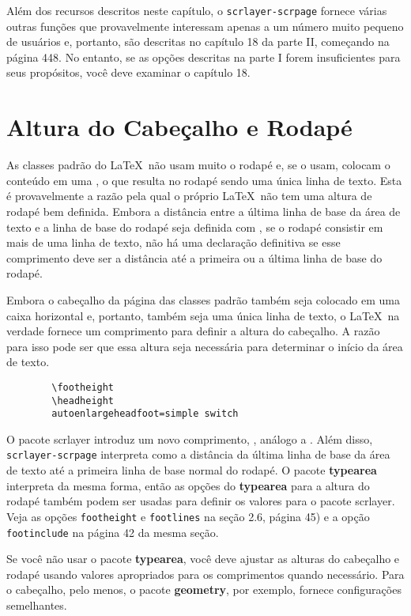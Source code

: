 Além dos recursos descritos neste capítulo, o \texttt{scrlayer-scrpage} fornece várias outras funções que provavelmente interessam apenas a um número muito pequeno de usuários e, portanto, são descritas no capítulo 18 da parte II, começando na página 448. No entanto, se as opções descritas na parte I forem insuficientes para seus propósitos, você deve examinar o capítulo 18.

\section{Altura do Cabeçalho e Rodapé}
As classes padrão do \LaTeX\ não usam muito o rodapé e, se o usam, colocam o conteúdo em uma , o que resulta no rodapé sendo uma única linha de texto. Esta é provavelmente a razão pela qual o próprio \LaTeX\ não tem uma altura de rodapé bem definida. Embora a distância entre a última linha de base da área de texto e a linha de base do rodapé seja definida com , se o rodapé consistir em mais de uma linha de texto, não há uma declaração definitiva se esse comprimento deve ser a distância até a primeira ou a última linha de base do rodapé.

Embora o cabeçalho da página das classes padrão também seja colocado em uma caixa horizontal e, portanto, também seja uma única linha de texto, o \LaTeX\ na verdade fornece um comprimento para definir a altura do cabeçalho. A razão para isso pode ser que essa altura seja necessária para determinar o início da área de texto.
\begin{verbatim}
        \footheight
        \headheight
        autoenlargeheadfoot=simple switch
\end{verbatim}

O pacote scrlayer introduz um novo comprimento, , análogo a . Além disso, \texttt{scrlayer-scrpage} interpreta  como a distância da última linha de base da área de texto até a primeira linha de base normal do rodapé. O pacote \textbf{typearea} interpreta  da mesma forma, então as opções do \textbf{typearea} para a altura do rodapé também podem ser usadas para definir os valores para o pacote scrlayer. Veja as opções \texttt{footheight} e \texttt{footlines} na seção 2.6, página 45) e a opção \texttt{foot\-inclu\-de} na página 42 da mesma seção.

Se você não usar o pacote \textbf{typearea}, você deve ajustar as alturas do cabeçalho e rodapé usando valores apropriados para os comprimentos quando necessário. Para o cabeçalho, pelo menos, o pacote \textbf{geometry}, por exemplo, fornece configurações semelhantes.

